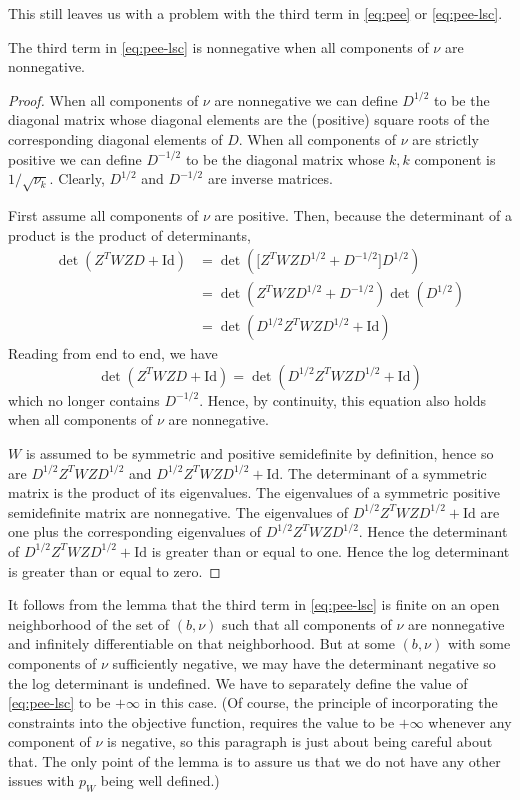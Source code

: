 This still leaves us with a problem with the third term in \eqref{eq:pee}
or \eqref{eq:pee-lsc}.
\begin{lemma}
The third term in \eqref{eq:pee-lsc} is nonnegative when all components of
$\nu$ are nonnegative.
\end{lemma}
\begin{proof}
When all components of $\nu$ are nonnegative we can define $D^{1/2}$ to be
the diagonal matrix whose diagonal elements are the (positive) square roots
of the corresponding diagonal elements of $D$.
When all components of $\nu$ are strictly positive we can define $D^{-1/2}$
to be the diagonal matrix whose $k, k$ component is $1 / \sqrt{\nu_k}$.
Clearly, $D^{1/2}$ and $D^{-1/2}$ are inverse matrices.

First assume all components of $\nu$ are positive.
Then, because the determinant
of a product is the product of determinants,
\begin{align*}
   \det \left( Z^T W Z D + \text{Id} \right)
   & =
   \det \left( \bigl[ Z^T W Z D^{1/2} + D^{-1/2} \bigr] D^{1/2} \right)
   \\
   & =
   \det \left( Z^T W Z D^{1/2} + D^{-1/2} \right) \det \left( D^{1/2} \right)
   \\
   & =
   \det \left( D^{1/2} Z^T W Z D^{1/2} + \text{Id} \right)
\end{align*}
Reading from end to end, we have
\begin{equation} \label{eq:symmetrization}
   \det \left( Z^T W Z D + \text{Id} \right)
   =
   \det \left( D^{1/2} Z^T W Z D^{1/2} + \text{Id} \right)
\end{equation}
which no longer contains $D^{-1/2}$.  Hence, by continuity, this equation
also holds when all components of $\nu$ are nonnegative.

$W$ is assumed to be symmetric and positive semidefinite by definition,
hence so are $D^{1/2} Z^T W Z D^{1/2}$
and $D^{1/2} Z^T W Z D^{1/2} + \text{Id}$.
The determinant of a symmetric matrix is the product of its eigenvalues.
The eigenvalues of a symmetric positive semidefinite matrix are nonnegative.
The eigenvalues of $D^{1/2} Z^T W Z D^{1/2} + \text{Id}$ are one plus the
corresponding eigenvalues of $D^{1/2} Z^T W Z D^{1/2}$.  Hence the determinant
of $D^{1/2} Z^T W Z D^{1/2} + \text{Id}$ is greater than or equal to one.
Hence the log determinant is greater than or equal to zero.
\end{proof}

It follows from the lemma that the third term in \eqref{eq:pee-lsc} is
finite on an open neighborhood of the set of $(b, \nu)$ such that all
components of $\nu$ are nonnegative and infinitely differentiable on
that neighborhood.  But at some $(b, \nu)$ with some components of $\nu$
sufficiently negative, we may have the determinant negative so the log
determinant is undefined.  We have to separately define the value of
\eqref{eq:pee-lsc} to be $+\infty$ in this case.
(Of course, the principle of incorporating the constraints into the
objective function, requires the value to be $+\infty$ whenever any
component of $\nu$ is negative, so this paragraph is just about being
careful about that.  The only point of the lemma is to assure us that
we do not have any other issues with $p_W$ being well defined.)

